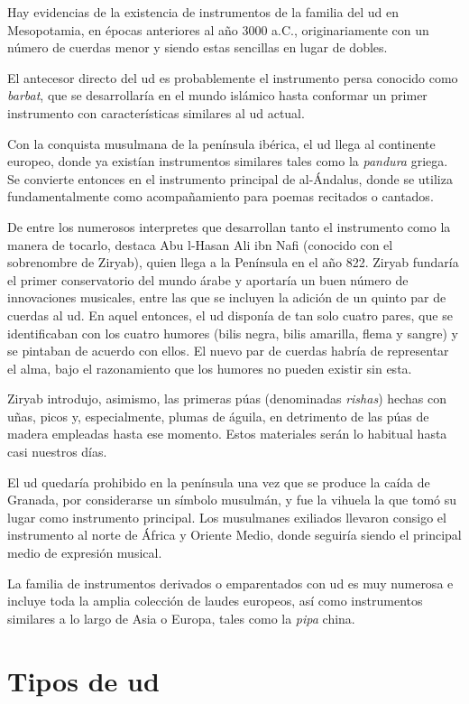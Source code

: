 Hay evidencias de la existencia de instrumentos de la familia del ud en Mesopotamia, en épocas anteriores al año 3000 a.C., originariamente con un número de cuerdas menor y siendo estas sencillas en lugar de dobles.

El antecesor directo del ud es probablemente el instrumento persa conocido como \emph{barbat}, que se desarrollaría en el mundo islámico hasta conformar un primer instrumento con características similares al ud actual.

Con la conquista musulmana de la península ibérica, el ud llega al continente europeo, donde ya existían instrumentos similares tales como la \emph{pandura} griega. Se convierte entonces en el instrumento principal de al-Ándalus, donde se utiliza fundamentalmente como acompañamiento para poemas recitados o cantados.

De entre los numerosos interpretes que desarrollan tanto el instrumento como la manera de tocarlo, destaca Abu l-Hasan Ali ibn Nafi (conocido con el sobrenombre de Ziryab), quien llega a la Península en el año 822. Ziryab fundaría el primer conservatorio del mundo árabe y aportaría un buen número de innovaciones musicales, entre las que se incluyen la adición de un quinto par de cuerdas al ud. En aquel entonces, el ud disponía de tan solo cuatro pares, que se identificaban con los cuatro humores (bilis negra, bilis amarilla, flema y sangre) y se pintaban de acuerdo con ellos. El nuevo par de cuerdas habría de representar el alma, bajo el razonamiento que los humores no pueden existir sin esta.

Ziryab introdujo, asimismo, las primeras púas (denominadas \emph{rishas}) hechas con uñas, picos y, especialmente, plumas de águila, en detrimento de las púas de madera empleadas hasta ese momento. Estos materiales serán lo habitual hasta casi nuestros días.

El ud quedaría prohibido en la península una vez que se produce la caída de Granada, por considerarse un símbolo musulmán, y fue la vihuela la que tomó su lugar como instrumento principal. Los musulmanes exiliados llevaron consigo el instrumento al norte de África y Oriente Medio, donde seguiría siendo el principal medio de expresión musical.

La familia de instrumentos derivados o emparentados con ud es muy numerosa e incluye toda la amplia colección de laudes europeos, así como instrumentos similares a lo largo de Asia o Europa, tales como la \emph{pipa} china.

\section{Tipos de ud}

